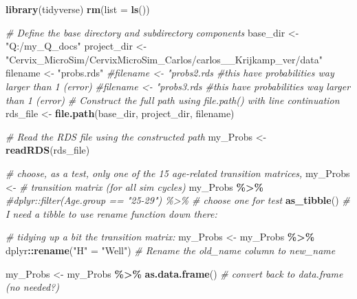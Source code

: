 \documentclass[
]{article}
\newenvironment{Shaded}{\begin{snugshade}}{\end{snugshade}}
\newcommand{\AttributeTok}[1]{\textcolor[rgb]{0.13,0.29,0.53}{#1}}
\newcommand{\CommentTok}[1]{\textcolor[rgb]{0.56,0.35,0.01}{\textit{#1}}}
\newcommand{\FunctionTok}[1]{\textcolor[rgb]{0.13,0.29,0.53}{\textbf{#1}}}
\newcommand{\NormalTok}[1]{#1}
\newcommand{\OtherTok}[1]{\textcolor[rgb]{0.56,0.35,0.01}{#1}}
\newcommand{\SpecialCharTok}[1]{\textcolor[rgb]{0.81,0.36,0.00}{\textbf{#1}}}
\newcommand{\StringTok}[1]{\textcolor[rgb]{0.31,0.60,0.02}{#1}}
\begin{document}
\begin{Shaded}
\begin{Highlighting}[]
\FunctionTok{library}\NormalTok{(tidyverse)}
\FunctionTok{rm}\NormalTok{(}\AttributeTok{list =} \FunctionTok{ls}\NormalTok{())}

\CommentTok{\# Define the base directory and subdirectory components}
\NormalTok{base\_dir }\OtherTok{\textless{}{-}} \StringTok{"Q:/my\_Q\_docs"}
\NormalTok{project\_dir }\OtherTok{\textless{}{-}} \StringTok{"Cervix\_MicroSim/CervixMicroSim\_Carlos/carlos\_\_Krijkamp\_ver/data"}
\NormalTok{filename }\OtherTok{\textless{}{-}} \StringTok{"probs.rds"}
\CommentTok{\#filename \textless{}{-} "probs2.rds \#this have probabilities way larger than 1 (error) }
\CommentTok{\#filename \textless{}{-} "probs3.rds \#this have probabilities way larger than 1 (error)}
\CommentTok{\# Construct the full path using file.path() with line continuation}
\NormalTok{rds\_file }\OtherTok{\textless{}{-}} \FunctionTok{file.path}\NormalTok{(base\_dir, project\_dir, filename)}

\CommentTok{\# Read the RDS file using the constructed path}
\NormalTok{my\_Probs }\OtherTok{\textless{}{-}} \FunctionTok{readRDS}\NormalTok{(rds\_file)}

\CommentTok{\# choose, as a test, only one of the 15 age{-}related transition matrices,}
\NormalTok{my\_Probs }\OtherTok{\textless{}{-}} \CommentTok{\# transition matrix (for all sim cycles) }
\NormalTok{  my\_Probs }\SpecialCharTok{\%\textgreater{}\%}
  \CommentTok{\#dplyr::filter(Age.group == "25{-}29") \%\textgreater{}\% \# choose one for test}
  \FunctionTok{as\_tibble}\NormalTok{() }\CommentTok{\# I need a tibble to use \textquotesingle{}rename\textquotesingle{} function down there:}

\CommentTok{\# tidying up a bit the transition matrix:}
\NormalTok{my\_Probs }\OtherTok{\textless{}{-}}\NormalTok{ my\_Probs }\SpecialCharTok{\%\textgreater{}\%}\NormalTok{ dplyr}\SpecialCharTok{::}\FunctionTok{rename}\NormalTok{(}\StringTok{"H"} \OtherTok{=} \StringTok{"Well"}\NormalTok{)}
\CommentTok{\# Rename the \textquotesingle{}old\_name\textquotesingle{} column to \textquotesingle{}new\_name\textquotesingle{}}

\NormalTok{my\_Probs }\OtherTok{\textless{}{-}}\NormalTok{ my\_Probs }\SpecialCharTok{\%\textgreater{}\%} \FunctionTok{as.data.frame}\NormalTok{() }\CommentTok{\# convert back to data.frame (no needed?)}


\end{Highlighting}
\end{Shaded}
\end{document}
